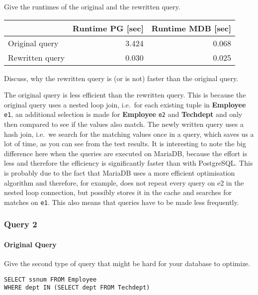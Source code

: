 \documentclass[11pt]{scrartcl}
\begin{document}
    Give the runtimes of the original and the rewritten query.

    \begin{table}[H]
        \centering
        \begin{tabular}{l|r|r}
            & Runtime PG [sec] & Runtime MDB [sec] \tabularnewline
            \hline
            Original query & 3.424 & 0.068 \tabularnewline
            Rewritten query & 0.030 & 0.025 \tabularnewline
        \end{tabular}
    \end{table}

    Discuss, why the rewritten query is (or is not) faster than the original query.

    The original query is less efficient than the rewritten query.
    This is because the original query uses a nested loop join, i.e.\ for each existing tuple in \textbf{Employee}
    \texttt{e1}, an additional selection is made for \textbf{Employee} \texttt{e2} and \textbf{Techdept} and only then
    compared to see if the values also match.
    The newly written query uses a hash join, i.e.\ we search for the matching values once in a query, which saves us a
    lot of time, as you can see from the test results. \newline
    It is interesting to note the big difference here when the queries are executed on MariaDB, because the effort is
    less and therefore the efficiency is significantly faster than with PostgreSQL\@.
    This is probably due to the fact that MariaDB uses a more efficient optimisation algorithm and therefore, for
    example, does not repeat every query on e2 in the nested loop connection, but possibly stores it in the cache and
    searches for matches on \texttt{e1}.
    This also means that queries have to be made less frequently.

    \subsubsection*{Query 2}

    \paragraph{Original Query}

    Give the second type of query that might be hard for your database to optimize.

    \begin{lstlisting}[style=dbtsql]
SELECT ssnum FROM Employee
WHERE dept IN (SELECT dept FROM Techdept)
    \end{lstlisting}
\end{document}
